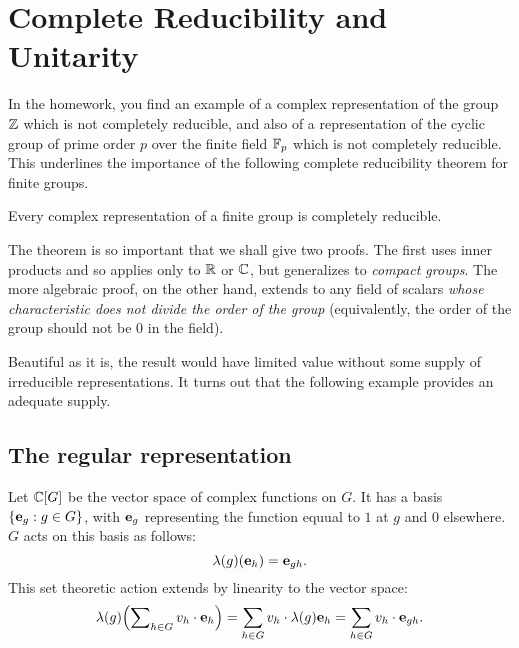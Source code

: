 \chapter{Complete Reducibility and Unitarity}
In the homework, you find an example of a complex representation of the
group \(\mathbb{Z}\) which is not completely reducible, and also of a
representation of the cyclic group of prime order \(p\) over the finite
field \(\mathbb{F}_p\) which is not completely reducible. This underlines the
importance of the following complete reducibility theorem for finite
groups.

\begin{theorem}
  Every complex representation of a finite group is completely reducible.
\end{theorem}

The theorem is so important that we shall give two proofs. The first uses
inner products and so applies only to \(\mathbb{R}\) or \(\mathbb{C}\), but generalizes
to \emph{compact groups}. The more algebraic proof, on the other hand,
extends to any field of scalars \emph{whose characteristic does not divide
  the order of the group} (equivalently, the order of the group should not
be \(0\) in the field).

Beautiful as it is, the result would have limited value without some supply
of irreducible representations. It turns out that the following example
provides an adequate supply.

\section{The regular representation}
Let \(\mathbb{C}[G]\) be the vector space of complex functions on \(G\). It has a
basis \(\{\mathbf{e}_g:g\in G\}\), with \(\mathbf{e}_g\) representing the function
equual to \(1\) at \(g\) and \(0\) elsewhere. \(G\) acts on this basis as
follows:
\[
  \lambda(g)(\mathbf{e}_h)=\mathbf{e}_{gh}.
\]
This set theoretic action extends by linearity to the vector space:
\[
  \lambda(g)\Bigl(\sum\nolimits_{h\in G} v_h\cdot\mathbf{e}_h\Bigr)
  =\sum_{h\in G}v_h\cdot\lambda(g)\mathbf{e}_h
  =\sum_{h\in G}v_h\cdot\mathbf{e}_{gh}.
\]


